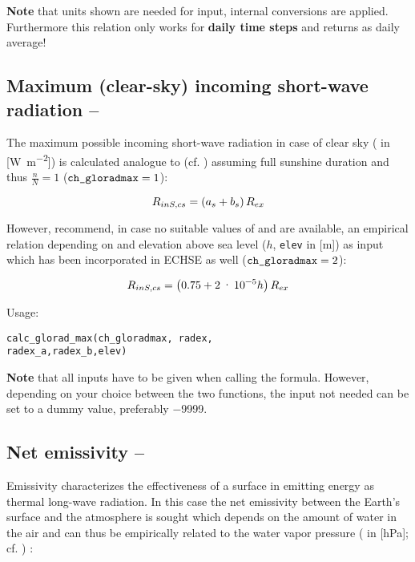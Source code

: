 \textbf{Note} that units shown are needed for input, internal conversions are applied. Furthermore this relation only works for \textbf{daily time steps} and returns \radShortwaveIn{} as daily average!


\subsection{Maximum (clear-sky) incoming short-wave radiation -- \radShortwaveInClearsky} \label{sec:meteo:radshortmax}
The maximum possible incoming short-wave radiation in case of clear sky (\radShortwaveInClearsky{} in [\si{\watt\per\metre\squared}]) is calculated analogue to \radShortwaveIn{} (cf. ) assuming full sunshine duration and thus $\frac{n}{N} = \num{1}$ ($\verb!ch_gloradmax! = 1$):

\begin{equation}\label{eqn:meteo:radshortmax_a}
R_{inS,cs}{} = \left( a_s + b_s \right) R_{ex}{}
\end{equation}

However, \citet{Allen2005} recommend, in case no suitable values of \angstA{} and \angstB{} are available, an empirical relation depending on \radExtraterr{} and elevation above sea level ($h$, \verb!elev! in [\si{\metre}]) as input which has been incorporated in ECHSE as well ($\verb!ch_gloradmax! = 2$):

\begin{equation}\label{eqn:meteo:radshortmax_b}
R_{inS,cs}{} = \left( 0.75 + \num{2e-5} h \right) R_{ex}{}
\end{equation}

\noindent
Usage:
\begin{verbatim}
calc_glorad_max(ch_gloradmax, radex,
radex_a,radex_b,elev)
\end{verbatim}

\textbf{Note} that all inputs have to be given when calling the formula. However, depending on your choice between the two functions, the input not needed can be set to a dummy value, preferably \num{-9999}.


\subsection{Net emissivity -- \emissivity} \label{sec:meteo:emiss}
Emissivity characterizes the effectiveness of a surface in emitting energy as thermal long-wave radiation. In this case the net emissivity between the Earth's surface and the atmosphere is sought which depends on the amount of water in the air and can thus be empirically related to the water vapor pressure (\vaporPressure{} in [\si{\hecto\pascal}]; cf. ) \citep{Maidment1993}:

